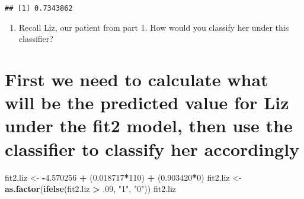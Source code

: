 \documentclass[]{article}
\newenvironment{Shaded}{\begin{snugshade}}{\end{snugshade}}
\newcommand{\KeywordTok}[1]{\textcolor[rgb]{0.13,0.29,0.53}{\textbf{#1}}}
\newcommand{\DecValTok}[1]{\textcolor[rgb]{0.00,0.00,0.81}{#1}}
\newcommand{\FloatTok}[1]{\textcolor[rgb]{0.00,0.00,0.81}{#1}}
\newcommand{\StringTok}[1]{\textcolor[rgb]{0.31,0.60,0.02}{#1}}
\newcommand{\OperatorTok}[1]{\textcolor[rgb]{0.81,0.36,0.00}{\textbf{#1}}}
\newcommand{\NormalTok}[1]{#1}
\providecommand{\tightlist}{%
  \setlength{\itemsep}{0pt}\setlength{\parskip}{0pt}}
\begin{document}
\begin{Shaded}
\end{Shaded}

\begin{verbatim}
## [1] 0.7343862
\end{verbatim}

\begin{enumerate}
\def\labelenumi{\alph{enumi}.}
\setcounter{enumi}{2}
\tightlist
\item
  Recall Liz, our patient from part 1. How would you classify her under
  this classifier?
\end{enumerate}

\section{First we need to calculate what will be the predicted value for
Liz under the fit2 model, then use the classifier to classify her
accordingly}\label{first-we-need-to-calculate-what-will-be-the-predicted-value-for-liz-under-the-fit2-model-then-use-the-classifier-to-classify-her-accordingly}

\begin{Shaded}
\begin{Highlighting}[]
\NormalTok{fit2.liz <-}\StringTok{ }\OperatorTok{-}\FloatTok{4.570256} \OperatorTok{+}\StringTok{ }\NormalTok{(}\FloatTok{0.018717}\OperatorTok{*}\DecValTok{110}\NormalTok{) }\OperatorTok{+}\StringTok{ }\NormalTok{(}\FloatTok{0.903420}\OperatorTok{*}\DecValTok{0}\NormalTok{)}
\NormalTok{fit2.liz <-}\StringTok{ }\KeywordTok{as.factor}\NormalTok{(}\KeywordTok{ifelse}\NormalTok{(fit2.liz }\OperatorTok{>}\StringTok{ }\NormalTok{.}\DecValTok{09}\NormalTok{, }\StringTok{"1"}\NormalTok{, }\StringTok{"0"}\NormalTok{))}
\NormalTok{  fit2.liz}
\end{Highlighting}
\end{Shaded}
\end{document}
